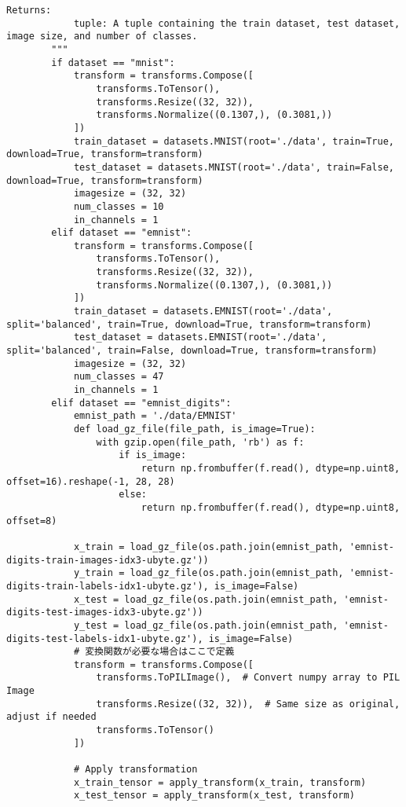 \begin{lstlisting}[style=pythonstyle, caption={メインコード}]
        Returns:
            tuple: A tuple containing the train dataset, test dataset, image size, and number of classes.
        """
        if dataset == "mnist":
            transform = transforms.Compose([
                transforms.ToTensor(),
                transforms.Resize((32, 32)),
                transforms.Normalize((0.1307,), (0.3081,))
            ])
            train_dataset = datasets.MNIST(root='./data', train=True, download=True, transform=transform)
            test_dataset = datasets.MNIST(root='./data', train=False, download=True, transform=transform)
            imagesize = (32, 32)
            num_classes = 10
            in_channels = 1
        elif dataset == "emnist":
            transform = transforms.Compose([
                transforms.ToTensor(),
                transforms.Resize((32, 32)),
                transforms.Normalize((0.1307,), (0.3081,))
            ])
            train_dataset = datasets.EMNIST(root='./data', split='balanced', train=True, download=True, transform=transform)
            test_dataset = datasets.EMNIST(root='./data', split='balanced', train=False, download=True, transform=transform)
            imagesize = (32, 32)
            num_classes = 47
            in_channels = 1
        elif dataset == "emnist_digits":
            emnist_path = './data/EMNIST'
            def load_gz_file(file_path, is_image=True):
                with gzip.open(file_path, 'rb') as f:
                    if is_image:
                        return np.frombuffer(f.read(), dtype=np.uint8, offset=16).reshape(-1, 28, 28)
                    else:
                        return np.frombuffer(f.read(), dtype=np.uint8, offset=8)
    
            x_train = load_gz_file(os.path.join(emnist_path, 'emnist-digits-train-images-idx3-ubyte.gz'))
            y_train = load_gz_file(os.path.join(emnist_path, 'emnist-digits-train-labels-idx1-ubyte.gz'), is_image=False)
            x_test = load_gz_file(os.path.join(emnist_path, 'emnist-digits-test-images-idx3-ubyte.gz'))
            y_test = load_gz_file(os.path.join(emnist_path, 'emnist-digits-test-labels-idx1-ubyte.gz'), is_image=False)
            # 変換関数が必要な場合はここで定義
            transform = transforms.Compose([
                transforms.ToPILImage(),  # Convert numpy array to PIL Image
                transforms.Resize((32, 32)),  # Same size as original, adjust if needed
                transforms.ToTensor()
            ])
    
            # Apply transformation
            x_train_tensor = apply_transform(x_train, transform)
            x_test_tensor = apply_transform(x_test, transform)
    

\end{lstlisting}
